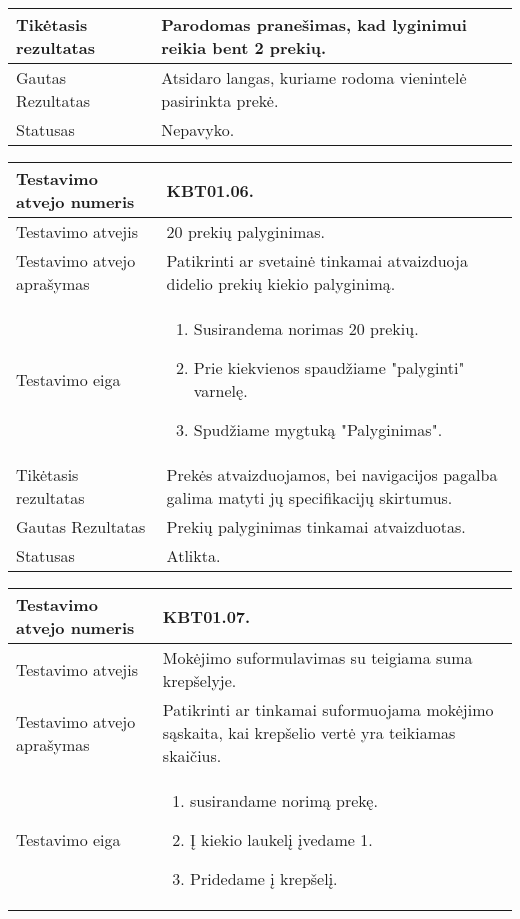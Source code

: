 \documentclass{VUMIFPSkursinis}
\begin{document}
\begin{center}
\begin{tabular}{ |p{5cm}|p{10cm}|}
	Tikėtasis rezultatas & Parodomas pranešimas, kad lyginimui reikia bent 2 prekių.  \\ \hline
	Gautas Rezultatas & Atsidaro langas, kuriame rodoma vienintelė pasirinkta prekė. \\ \hline
	Statusas & Nepavyko. \\ \hline
	\end{tabular}
\vspace{1cm}
\begin{tabular}{ |p{5cm}|p{10cm}|}
	\hline
	Testavimo atvejo numeris & KBT01.06. \\ \hline
	Testavimo atvejis & 20 prekių palyginimas. \\ \hline
	Testavimo atvejo aprašymas & Patikrinti ar svetainė tinkamai atvaizduoja didelio prekių kiekio palyginimą. \\ \hline
	Testavimo eiga &  
	\begin{enumerate} 
		\item Susirandema norimas 20 prekių.
		\item Prie kiekvienos spaudžiame "palyginti" varnelę.
		\item Spudžiame mygtuką "Palyginimas".
	\end{enumerate} \\ \hline
	Tikėtasis rezultatas & Prekės atvaizduojamos, bei navigacijos pagalba galima matyti jų specifikacijų skirtumus. \\ \hline
	Gautas Rezultatas & Prekių palyginimas tinkamai atvaizduotas. \\ \hline
	Statusas & Atlikta. \\ \hline
	\end{tabular}
\vspace{1cm}
\begin{tabular}{ |p{5cm}|p{10cm}|}
	\hline
	Testavimo atvejo numeris & KBT01.07. \\ \hline
	Testavimo atvejis & Mokėjimo suformulavimas su teigiama suma krepšelyje. \\ \hline
	Testavimo atvejo aprašymas & Patikrinti ar tinkamai suformuojama mokėjimo sąskaita, kai krepšelio vertė yra teikiamas skaičius. \\ \hline
	Testavimo eiga &
	\begin{enumerate} 
		\item susirandame norimą prekę.
		\item Į kiekio laukelį įvedame 1.
		\item Pridedame į krepšelį.

\end{enumerate}
\end{tabular}
\end{center}
\end{document}
